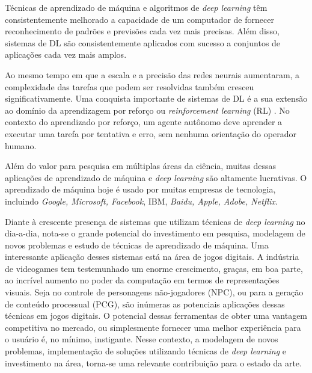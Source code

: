 Técnicas de aprendizado de máquina e algoritmos de \textit{deep learning} têm consistentemente melhorado a capacidade de um computador de fornecer reconhecimento de padrões e previsões cada vez mais precisas. Além disso, sistemas de DL são consistentemente aplicados com sucesso a conjuntos de aplicações cada vez mais amplos.

Ao mesmo tempo em que a escala e a precisão das redes neurais aumentaram, a complexidade das tarefas que podem ser resolvidas também cresceu significativamente. 
Uma conquista importante de sistemas de DL é a sua extensão ao domínio da aprendizagem por reforço ou \textit{reinforcement learning} (RL) \cite{reinforcement-learning-intro-2018}. No contexto do aprendizado por reforço, um agente autônomo deve aprender a executar uma tarefa por tentativa e erro, sem nenhuma orientação do operador humano. 

Além do valor para pesquisa em múltiplas áreas da ciência, muitas dessas aplicações de aprendizado de máquina e \textit{deep learning} são altamente lucrativas. O aprendizado de máquina hoje é usado por muitas empresas de tecnologia, incluindo \textit{Google, Microsoft, Facebook}, IBM, \textit{Baidu, Apple, Adobe, Netflix}.

Diante à crescente presença de sistemas que utilizam técnicas de \textit{deep learning} no dia-a-dia, nota-se o grande potencial do investimento em pesquisa, modelagem de novos problemas e estudo de técnicas de aprendizado de máquina. 
%
Uma interessante aplicação desses sistemas está na área de jogos digitais. A indústria de videogames tem testemunhado um enorme crescimento, graças, em boa parte, ao incrível aumento no poder da computação em termos de representações visuais. 
%
%
Seja no controle de personagens não-jogadores (NPC), ou para a geração de conteúdo processual (PCG), são inúmeras as potenciais aplicações dessas técnicas em jogos digitais.
%
O potencial dessas ferramentas de obter uma vantagem competitiva no mercado, ou simplesmente fornecer uma melhor experiência para o usuário é, no mínimo, instigante.
%
Nesse contexto, a modelagem de novos problemas, implementação de soluções utilizando técnicas de \textit{deep learning} e investimento na área, torna-se uma relevante contribuição para o estado da arte.


